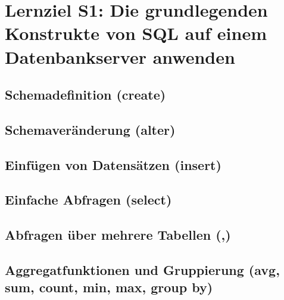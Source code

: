 \section{Lernziel S1: Die grundlegenden Konstrukte von SQL auf einem
Datenbankserver anwenden}

\subsection{Schemadefinition (create)}

\subsection{Schemaveränderung (alter)}

\subsection{Einfügen von Datensätzen (insert)}

\subsection{Einfache Abfragen (select)}

\subsection{Abfragen über mehrere Tabellen (,)}

\subsection{Aggregatfunktionen und Gruppierung (avg, sum, count, min, max, group by)}